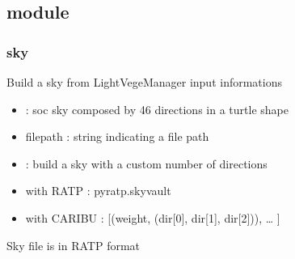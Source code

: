 \documentclass[letterpaper,10pt,english]{sphinxmanual}
\begin{document}
\subsection{ module}
\label{\detokenize{reference:module-sky}}\label{\detokenize{reference:sky-module}}

\subsubsection{sky}
\label{\detokenize{reference:sky}}
\sphinxAtStartPar
Build a sky from LightVegeManager input informations
\begin{description}
\begin{itemize}
\item {} 
\sphinxAtStartPar
{} : soc sky composed by 46 directions in a turtle shape

\item {} 
\sphinxAtStartPar
filepath : string indicating a file path

\item {} 
\sphinxAtStartPar
{} : build a sky with a custom number of directions

\end{itemize}

\begin{itemize}
\item {} 
\sphinxAtStartPar
with RATP : pyratp.skyvault

\item {} 
\sphinxAtStartPar
with CARIBU : {[}(weight, (dir{[}0{]}, dir{[}1{]}, dir{[}2{]})), … {]}

\end{itemize}

\end{description}

\sphinxAtStartPar
Sky file is in RATP format
\end{document}
